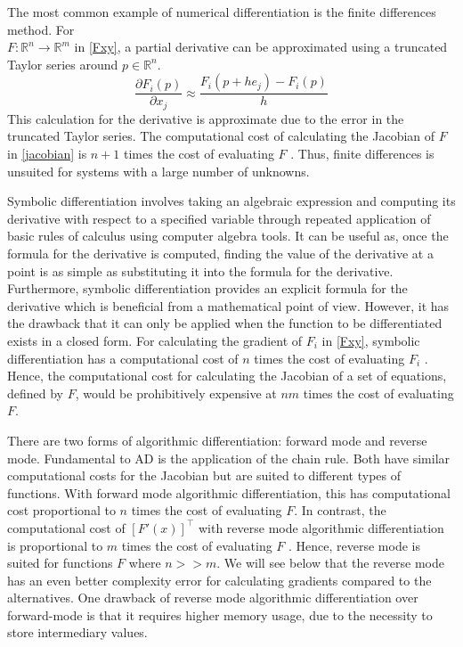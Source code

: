 \documentclass{article}
\begin{document}
The most common example of numerical differentiation is the finite differences method. For \\ $F: \mathbb{R}^n \longrightarrow \mathbb{R}^m$ in \eqref{Fxy}, a partial derivative can be approximated using a truncated Taylor series around $p \in \mathbb{R}^n$. 
\begin{equation}
    \frac{\partial F_i (p)}{\partial x_j} \approx \frac{F_i(p+he_j) - F_i(p)}{h}
\end{equation}
This calculation for the derivative is approximate due to the error in the truncated Taylor series. The computational cost of calculating the Jacobian of $F$ in \eqref{jacobian} is $n + 1$ times the cost of evaluating $F$ \cite{chem}. Thus, finite differences is unsuited for systems with a large number of unknowns.

Symbolic differentiation involves taking an algebraic expression and computing its derivative with respect to a specified variable through repeated application of basic rules of calculus using computer algebra tools. It can be useful as, once the formula for the derivative is computed, finding the value of the derivative at a point is as simple as substituting it into the formula for the derivative.  Furthermore, symbolic differentiation provides an explicit formula for the derivative which is beneficial from a mathematical point of view. However, it has the drawback that it can only be applied when the function to be differentiated exists in a closed form. For calculating the gradient of $F_i$ in \eqref{Fxy}, symbolic differentiation has a computational cost of $n$ times the cost of evaluating $F_i$ \cite{chem}. Hence, the computational cost for calculating the Jacobian of a set of equations, defined by $F$, would be prohibitively expensive at $nm$ times the cost of evaluating $F$.

There are two forms of algorithmic differentiation: forward mode and reverse mode. Fundamental to AD is the application of the chain rule. Both have similar computational costs for the Jacobian but are suited to different types of functions. With forward mode algorithmic differentiation, this has computational cost proportional to $n$ times the cost of evaluating $F$. In contrast, the computational cost of $[F'(x)]^\top$ with reverse mode algorithmic differentiation is proportional to $m$ times the cost of evaluating $F$ \cite{falisse}. Hence, reverse mode is suited for functions $F$ where $n >> m$. We will see below that the reverse mode has an even better complexity error for calculating gradients compared to the alternatives. One drawback of reverse mode algorithmic differentiation over forward-mode is that it requires higher memory usage, due to the necessity to store intermediary values.
\end{document}

